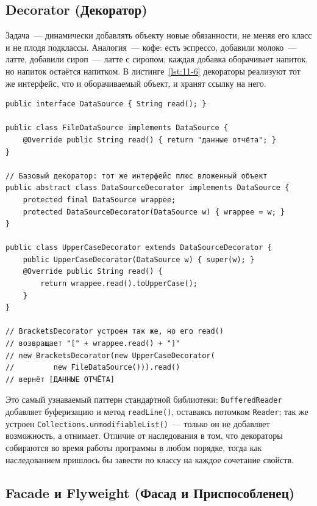 \subsection{Decorator (Декоратор)}

Задача~--- динамически добавлять объекту новые обязанности, не меняя его класс и
не плодя подклассы. Аналогия~--- кофе: есть эспрессо, добавили молоко~--- латте,
добавили сироп~--- латте с сиропом; каждая добавка оборачивает напиток, но
напиток остаётся напитком. В листинге~\ref{lst:11-6} декораторы реализуют тот же
интерфейс, что и оборачиваемый объект, и хранят ссылку на него.

\begin{listing}[H]
\begin{verbatim}
public interface DataSource { String read(); }

public class FileDataSource implements DataSource {
    @Override public String read() { return "данные отчёта"; }
}

// Базовый декоратор: тот же интерфейс плюс вложенный объект
public abstract class DataSourceDecorator implements DataSource {
    protected final DataSource wrappee;
    protected DataSourceDecorator(DataSource w) { wrappee = w; }
}

public class UpperCaseDecorator extends DataSourceDecorator {
    public UpperCaseDecorator(DataSource w) { super(w); }
    @Override public String read() {
        return wrappee.read().toUpperCase();
    }
}

// BracketsDecorator устроен так же, но его read()
// возвращает "[" + wrappee.read() + "]"
// new BracketsDecorator(new UpperCaseDecorator(
//         new FileDataSource())).read()
// вернёт [ДАННЫЕ ОТЧЁТА]
\end{verbatim}
\caption{Декораторы складываются как матрёшка}
\label{lst:11-6}
\end{listing}

Это самый узнаваемый паттерн стандартной библиотеки: \texttt{BufferedReader}
добавляет буферизацию и метод \texttt{readLine()}, оставаясь потомком
\texttt{Reader}; так же устроен \texttt{Collections.unmodifiableList()}~---
только он не добавляет возможность, а отнимает. Отличие от наследования в том,
что декораторы собираются во время работы программы в любом порядке, тогда как
наследованием пришлось бы завести по классу на каждое сочетание свойств.

\subsection{Facade и Flyweight (Фасад и Приспособленец)}

